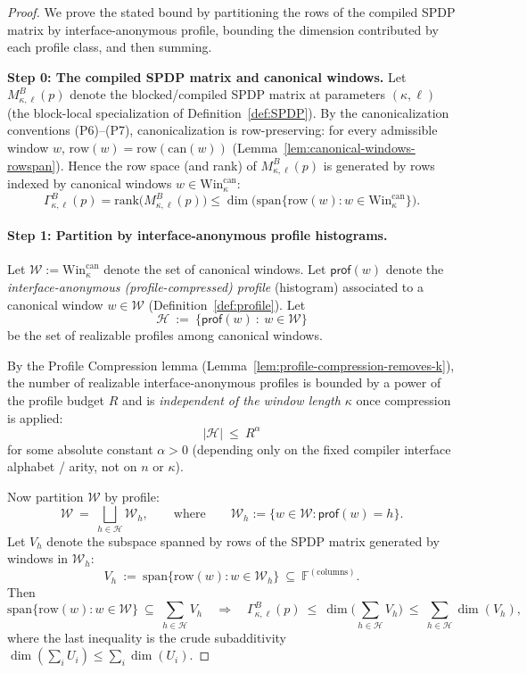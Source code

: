 \documentclass[12pt]{article}
\theoremstyle{definition}
\theoremstyle{definition}
\theoremstyle{remark}
\theoremstyle{remark}
\begin{document}
\begin{proof}
We prove the stated bound by partitioning the rows of the compiled SPDP matrix by
interface-anonymous profile, bounding the dimension contributed by each profile class, and
then summing.

\noindent\textbf{Step 0: The compiled SPDP matrix and canonical windows.}
Let $M^B_{\kappa,\ell}(p)$ denote the blocked/compiled SPDP matrix at parameters $(\kappa,\ell)$
(the block-local specialization of Definition~\ref{def:SPDP}).
By the canonicalization conventions (P6)--(P7), canonicalization is row-preserving:
for every admissible window $w$, $\mathrm{row}(w)=\mathrm{row}(\mathrm{can}(w))$
(Lemma~\ref{lem:canonical-windows-rowspan}).
Hence the row space (and rank) of $M^B_{\kappa,\ell}(p)$ is generated by rows indexed by
canonical windows $w\in \mathrm{Win}^{\mathrm{can}}_\kappa$:
\[
\Gamma^B_{\kappa,\ell}(p)=\mathrm{rank}\big(M^B_{\kappa,\ell}(p)\big)
\le \dim\Big(\mathrm{span}\{\mathrm{row}(w): w\in \mathrm{Win}^{\mathrm{can}}_\kappa\}\Big).
\]

\paragraph{Step 1: Partition by interface-anonymous profile histograms.}
Let $\mathcal{W}:= \mathrm{Win}^{\mathrm{can}}_\kappa$ denote the set of canonical windows.
Let $\mathsf{prof}(w)$ denote the \emph{interface-anonymous (profile-compressed) profile}
(histogram) associated to a canonical window $w\in\mathcal{W}$ (Definition~\ref{def:profile}).
Let
\[
\mathcal{H}\ :=\ \{\mathsf{prof}(w)\ :\ w\in\mathcal{W}\}
\]
be the set of realizable profiles among canonical windows.

By the Profile Compression lemma (Lemma~\ref{lem:profile-compression-removes-k}), the number of realizable interface-anonymous profiles is bounded by a
power of the profile budget $R$ and is \emph{independent of the window length $\kappa$} once
compression is applied:
\[
|\mathcal{H}|\ \le\ R^{\alpha}
\]
for some absolute constant $\alpha>0$ (depending only on the fixed compiler interface
alphabet / arity, not on $n$ or $\kappa$).

Now partition $\mathcal{W}$ by profile:
\[
\mathcal{W}\ =\ \bigsqcup_{h\in\mathcal{H}} \mathcal{W}_h,
\qquad\text{where}\qquad
\mathcal{W}_h := \{w\in\mathcal{W}:\mathsf{prof}(w)=h\}.
\]
Let $V_h$ denote the subspace spanned by rows of the SPDP matrix generated by windows in
$\mathcal{W}_h$:
\[
V_h\ :=\ \mathrm{span}\{\mathrm{row}(w): w\in\mathcal{W}_h\}\ \subseteq\ \mathbb{F}^{(\text{columns})}.
\]
Then
\[
\mathrm{span}\{\mathrm{row}(w): w\in\mathcal{W}\}\ \subseteq\ \sum_{h\in\mathcal{H}} V_h
\quad\Longrightarrow\quad
\Gamma^B_{\kappa,\ell}(p)\ \le\ \dim\Big(\sum_{h\in\mathcal{H}} V_h\Big)
\ \le\ \sum_{h\in\mathcal{H}} \dim(V_h),
\]
where the last inequality is the crude subadditivity $\dim(\sum_i U_i)\le \sum_i \dim(U_i)$.


\end{proof}
\end{document}
